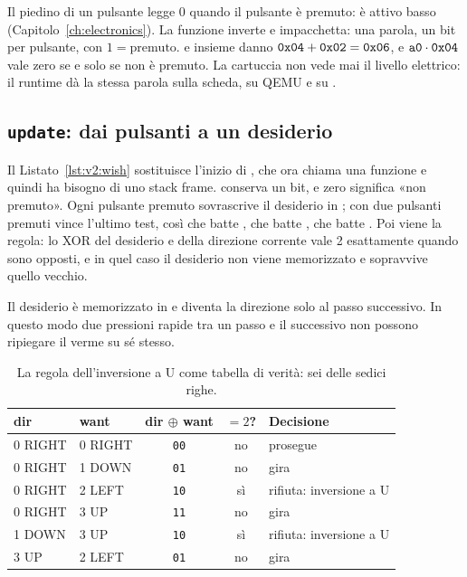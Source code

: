 Il piedino di un pulsante legge 0 quando il pulsante è premuto: è attivo basso
(Capitolo~\ref{ch:electronics}). La funzione  inverte
e impacchetta: una parola, un bit per pulsante, con $1=\text{premuto}$.
 e  insieme danno $\texttt{0x04}+\texttt{0x02}=\texttt{0x06}$, e
$\texttt{a0}\cdot\texttt{0x04}$ vale zero se e solo se  non è premuto. La
cartuccia non vede mai il livello elettrico: il runtime dà la stessa parola
sulla scheda, su QEMU e su \prgqt.

\subsection{\texttt{update}: dai pulsanti a un desiderio}


Il Listato~\ref{lst:v2:wish} sostituisce l'inizio di , che
ora chiama una funzione e quindi ha bisogno di uno stack frame. 
conserva un bit, e zero significa «non premuto». Ogni pulsante premuto
sovrascrive il desiderio in ; con due pulsanti premuti vince l'ultimo
test, così che  batte , che batte , che batte
. Poi viene la regola: lo XOR del desiderio e della direzione
corrente vale 2 esattamente quando sono opposti, e in quel caso il desiderio
non viene memorizzato e sopravvive quello vecchio.

Il desiderio è memorizzato in  e diventa la direzione solo al passo
successivo. In questo modo due pressioni rapide tra un passo e il successivo
non possono ripiegare il verme su sé stesso.

\begin{table}[htb]
\centering\small
\caption{La regola dell'inversione a U come tabella di verità: sei delle sedici righe.}\label{tab:v2:uturn}
\begin{tabular}{@{}llccl@{}}
\toprule
\textbf{dir} & \textbf{want} & \textbf{dir $\oplus$ want} & \textbf{$=2$?} & \textbf{Decisione}\\
\midrule
0 RIGHT & 0 RIGHT & \texttt{00} & no & prosegue\\
0 RIGHT & 1 DOWN & \texttt{01} & no & gira\\
0 RIGHT & 2 LEFT & \texttt{10} & sì & rifiuta: inversione a U\\
0 RIGHT & 3 UP & \texttt{11} & no & gira\\
1 DOWN & 3 UP & \texttt{10} & sì & rifiuta: inversione a U\\
3 UP & 2 LEFT & \texttt{01} & no & gira\\
\bottomrule
\end{tabular}
\end{table}

